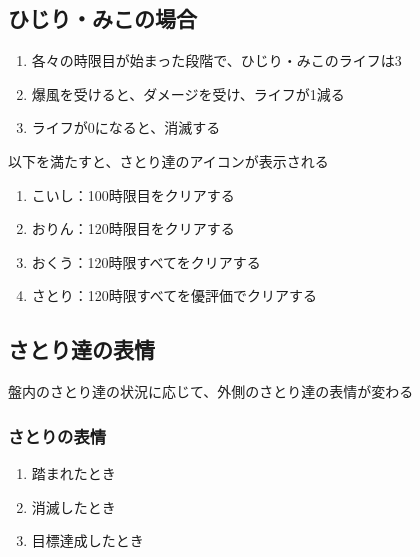 \clearpage
\subsection{ひじり・みこの場合}
\begin{enumerate}[label={\sarrow}]
\item 各々の時限目が始まった段階で、ひじり・みこのライフは3
\item 爆風を受けると、ダメージを受け、ライフが1減る
\item ライフが0になると、消滅する
\end{enumerate}



以下を満たすと、さとり達のアイコンが表示される
\begin{enumerate}[label={\sarrow}]
\item こいし：100時限目をクリアする
\item おりん：120時限目をクリアする
\item おくう：120時限すべてをクリアする
\item さとり：120時限すべてを優評価でクリアする
\end{enumerate}





\subsection{さとり達の表情}
盤内のさとり達の状況に応じて、外側のさとり達の表情が変わる

\subsubsection{さとりの表情}
\begin{enumerate}[label={\sarrow}]
\item 踏まれたとき
\item 消滅したとき
\item 目標達成したとき
\end{enumerate}

